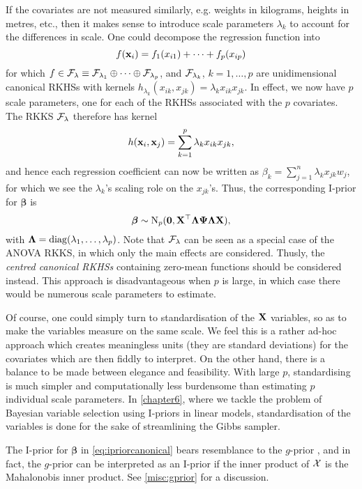 If the covariates are not measured similarly, e.g. weights in kilograms, heights in metres, etc., then it makes sense to introduce scale parameters $\lambda_k$ to account for the differences in scale.
One could decompose the regression function into
\[
  f({\mathbf x}_i) = f_1(x_{i1}) + \cdots + f_p(x_{ip}) 
\]
for which $f \in {\mathcal F}_\lambda \equiv {\mathcal F}_{\lambda_1}\oplus\cdots\oplus{\mathcal F}_{\lambda_p}$, and ${\mathcal F}_{\lambda_k}$, $k=1,\dots,p$ are unidimensional canonical RKHSs with kernels $h_{\lambda_k}(x_{ik},x_{jk}) = \lambda_k x_{ik} x_{jk}$.
In effect, we now have $p$ scale parameters, one for each of the RKHSs associated with the $p$ covariates.
The RKKS ${\mathcal F}_\lambda$ therefore has kernel
\[
  h({\mathbf x}_i,{\mathbf x}_j) = \sum_{k=1}^p \lambda_k  x_{ik} x_{jk},
\]
and hence each regression coefficient can now be written as $\beta_k =  \sum_{j=1}^n  \lambda_k x_{jk}w_j$, for which we see the $\lambda_k$'s scaling role on the $x_{jk}$'s.
Thus, the corresponding I-prior for $\boldsymbol{\beta}$ is
\[
  \boldsymbol{\beta} \sim \operatorname{N}_p({\mathbf 0}, {\mathbf X}^\top{\bm\Lambda} {\bm\Psi} {\bm\Lambda} {\mathbf X}),
\]
with ${\bm\Lambda} = \operatorname{diag}(\lambda_1,\dots,\lambda_p)$.
Note that ${\mathcal F}_\lambda$ can be seen as a special case of the ANOVA RKKS, in which only the main effects are considered. 
Thusly, the \emph{centred canonical RKHSs} containing zero-mean functions should be considered instead.
This approach is disadvantageous when $p$ is large, in which case there would be numerous scale parameters to estimate.

\begin{remark}
  Of course, one could simply turn to standardisation of the ${\mathbf X}$ variables, so as to make the variables measure on the same scale.
  We feel this is a rather ad-hoc approach which creates meaningless units (they are standard deviations) for the covariates which are then fiddly to interpret.
  On the other hand, there is a balance to be made between elegance and feasibility.
  With large $p$, standardising is much simpler and computationally less burdensome than estimating $p$ individual scale parameters.
  In \cref{chapter6}, where we tackle the problem of  Bayesian variable selection using I-priors in linear models, standardisation of the variables is done for the sake of streamlining the Gibbs sampler.
\end{remark}


\begin{remark}
  The I-prior for $\boldsymbol{\beta}$ in \cref{eq:ipriorcanonical} bears resemblance to the $g$-prior \citep{zellner1986assessing}, and in fact, the $g$-prior can be interpreted as an I-prior if the inner product of ${\mathcal X}$ is the Mahalonobis inner product.
  See \cref{misc:gprior}  for a discussion.
\end{remark}

